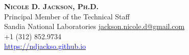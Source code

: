 	{\Large{\textsc{\textbf{Nicole D. Jackson, Ph.D.}}}} \\
	Principal Member of the Technical Staff \\
	Sandia National Laboratories
	\tcblower
	\faEnvelopeSquare \quad \href{mailto:jackson.nicole.d@gmail.com}{jackson.nicole.d@gmail.com} \\
	\faMobile \quad  +1 (312) 852.9734                    \\
	\faGlobe \quad \href{https://ndjackso.github.io}{\textcolor{blue}{https://ndjackso.github.io}}

